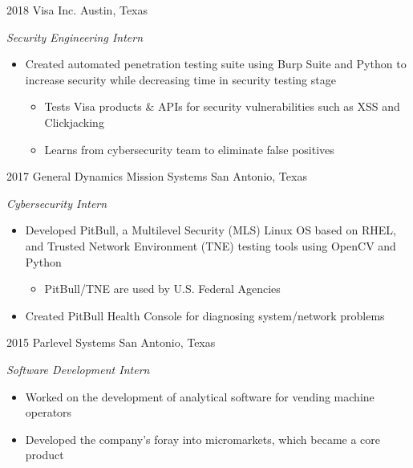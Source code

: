 \documentclass[]{friggeri-cv} %
\begin{document}
\begin{entrylist}

	\entry
	{2018}
	{Visa Inc.}
	{Austin, Texas}
	{\emph{Security Engineering Intern}
		\begin{itemize}
			\item Created automated penetration testing suite using Burp Suite and Python to increase security while decreasing time in security testing stage
			\begin{itemize}
				\item Tests Visa products \& APIs for security vulnerabilities such as XSS and Clickjacking
				\item Learns from cybersecurity team to eliminate false positives
			\end{itemize}
		\end{itemize}
	}


	\entry
	{2017}
	{General Dynamics Mission Systems}
	{San Antonio, Texas}
	{\emph{Cybersecurity Intern}
		\begin{itemize}
			\item Developed PitBull, a Multilevel Security (MLS) Linux OS based on RHEL, and Trusted Network Environment (TNE) testing tools using OpenCV and Python
			\begin{itemize}
				\item PitBull/TNE are used by U.S. Federal Agencies
			\end{itemize}
			\item Created PitBull Health Console for diagnosing system/network problems
		\end{itemize}
	}


	\entry
	{2015}
	{Parlevel Systems}
	{San Antonio, Texas}
	{\emph{Software Development Intern}
		\begin{itemize}
			\item Worked on the development of analytical software for vending machine operators
			\item Developed the company's foray into micromarkets, which became a core product
		\end{itemize}
	}

\end{entrylist}

\end{document}

